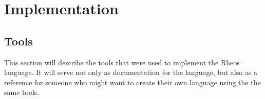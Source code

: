 \chapter{Implementation}\label{chap:implementation}


%
%
%

\section{Tools}
This section will describe the tools that were used to implement the
Rheos language. It will serve not only as documentation for the
language, but also as a reference for someone who might want to create
their own language using the the same tools.

